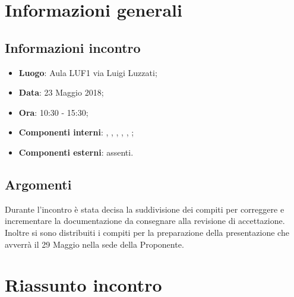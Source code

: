 \section{Informazioni generali}
\subsection{Informazioni incontro}
\begin{itemize}
\item \textbf{Luogo}: Aula LUF1 via Luigi Luzzati;
\item \textbf{Data}: 23 Maggio 2018;
\item \textbf{Ora}: 10:30 - 15:30;
\item \textbf{Componenti interni}: \Tommaso, \Carlo, \Isacco, \Mattia, \Luca, \Cristian;
\item \textbf{Componenti esterni}: assenti.
\end{itemize}

\subsection{Argomenti}
Durante l'incontro è stata decisa la suddivisione dei compiti per correggere e incrementare la documentazione da consegnare alla revisione di accettazione. Inoltre si sono distribuiti i compiti per la preparazione della presentazione che avverrà il 29 Maggio nella sede della Proponente.

\section{Riassunto incontro}

